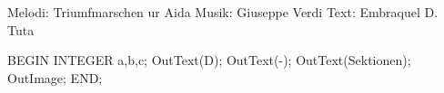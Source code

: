 \begin{song}


\begin{songmeta}
Melodi: Triumfmarschen ur Aida
Musik: Giuseppe Verdi
Text: Embraquel D. Tuta
\end{songmeta}

\begin{songtext}
BEGIN
INTEGER a,b,c;
OutText(D);
OutText(-);
OutText(Sektionen); OutImage;
END;
\end{songtext}

\begin{songnotes}
\end{songnotes}

\end{song}
